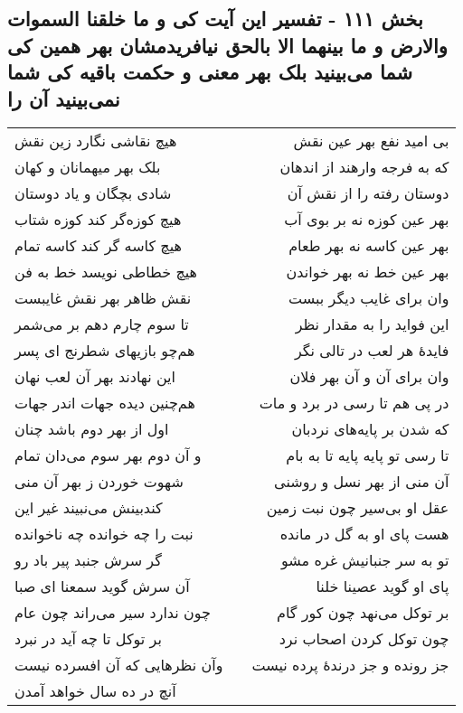 \begin{center}
\section*{بخش ۱۱۱ - تفسیر این آیت کی و ما خلقنا السموات والارض و ما بینهما الا بالحق نیافریدمشان بهر همین کی شما می‌بینید  بلک بهر معنی و حکمت باقیه کی شما نمی‌بینید آن را}
\label{sec:sh111}
\begin{longtable}{l p{0.5cm} r}
هیچ نقاشی نگارد زین نقش
&&
بی امید نفع بهر عین نقش
\\
بلک بهر میهمانان و کهان
&&
که به فرجه وارهند از اندهان
\\
شادی بچگان و یاد دوستان
&&
دوستان رفته را از نقش آن
\\
هیچ کوزه‌گر کند کوزه شتاب
&&
بهر عین کوزه نه بر بوی آب
\\
هیچ کاسه گر کند کاسه تمام
&&
بهر عین کاسه نه بهر طعام
\\
هیچ خطاطی نویسد خط به فن
&&
بهر عین خط نه بهر خواندن
\\
نقش ظاهر بهر نقش غایبست
&&
وان برای غایب دیگر ببست
\\
تا سوم چارم دهم بر می‌شمر
&&
این فواید را به مقدار نظر
\\
هم‌چو بازیهای شطرنج ای پسر
&&
فایدهٔ هر لعب در تالی نگر
\\
این نهادند بهر آن لعب نهان
&&
وان برای آن و آن بهر فلان
\\
هم‌چنین دیده جهات اندر جهات
&&
در پی هم تا رسی در برد و مات
\\
اول از بهر دوم باشد چنان
&&
که شدن بر پایه‌های نردبان
\\
و آن دوم بهر سوم می‌دان تمام
&&
تا رسی تو پایه پایه تا به بام
\\
شهوت خوردن ز بهر آن منی
&&
آن منی از بهر نسل و روشنی
\\
کندبینش می‌نبیند غیر این
&&
عقل او بی‌سیر چون نبت زمین
\\
نبت را چه خوانده چه ناخوانده
&&
هست پای او به گل در مانده
\\
گر سرش جنبد پیر باد رو
&&
تو به سر جنبانیش غره مشو
\\
آن سرش گوید سمعنا ای صبا
&&
پای او گوید عصینا خلنا
\\
چون ندارد سیر می‌راند چون عام
&&
بر توکل می‌نهد چون کور گام
\\
بر توکل تا چه آید در نبرد
&&
چون توکل کردن اصحاب نرد
\\
وآن نظرهایی که آن افسرده نیست
&&
جز رونده و جز درندهٔ پرده نیست
\\
آنچ در ده سال خواهد آمدن

\end{longtable}
\end{center}
